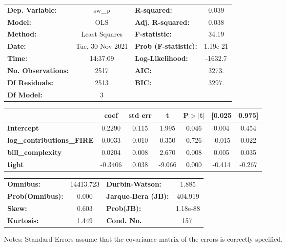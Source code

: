 \begin{center}
\begin{tabular}{lclc}
\toprule
\textbf{Dep. Variable:}           &      sw\_p       & \textbf{  R-squared:         } &     0.039   \\
\textbf{Model:}                   &       OLS        & \textbf{  Adj. R-squared:    } &     0.038   \\
\textbf{Method:}                  &  Least Squares   & \textbf{  F-statistic:       } &     34.19   \\
\textbf{Date:}                    & Tue, 30 Nov 2021 & \textbf{  Prob (F-statistic):} &  1.19e-21   \\
\textbf{Time:}                    &     14:37:09     & \textbf{  Log-Likelihood:    } &   -1632.7   \\
\textbf{No. Observations:}        &        2517      & \textbf{  AIC:               } &     3273.   \\
\textbf{Df Residuals:}            &        2513      & \textbf{  BIC:               } &     3297.   \\
\textbf{Df Model:}                &           3      & \textbf{                     } &             \\
\bottomrule
\end{tabular}
\begin{tabular}{lcccccc}
                                  & \textbf{coef} & \textbf{std err} & \textbf{t} & \textbf{P$> |$t$|$} & \textbf{[0.025} & \textbf{0.975]}  \\
\midrule
\textbf{Intercept}                &       0.2290  &        0.115     &     1.995  &         0.046        &        0.004    &        0.454     \\
\textbf{log\_contributions\_FIRE} &       0.0033  &        0.010     &     0.350  &         0.726        &       -0.015    &        0.022     \\
\textbf{bill\_complexity}         &       0.0204  &        0.008     &     2.670  &         0.008        &        0.005    &        0.035     \\
\textbf{tight}                    &      -0.3406  &        0.038     &    -9.066  &         0.000        &       -0.414    &       -0.267     \\
\bottomrule
\end{tabular}
\begin{tabular}{lclc}
\textbf{Omnibus:}       & 14413.723 & \textbf{  Durbin-Watson:     } &    1.885  \\
\textbf{Prob(Omnibus):} &    0.000  & \textbf{  Jarque-Bera (JB):  } &  404.919  \\
\textbf{Skew:}          &    0.603  & \textbf{  Prob(JB):          } & 1.18e-88  \\
\textbf{Kurtosis:}      &    1.449  & \textbf{  Cond. No.          } &     157.  \\
\bottomrule
\end{tabular}
\end{center}

Notes: \newline
 [1] Standard Errors assume that the covariance matrix of the errors is correctly specified.